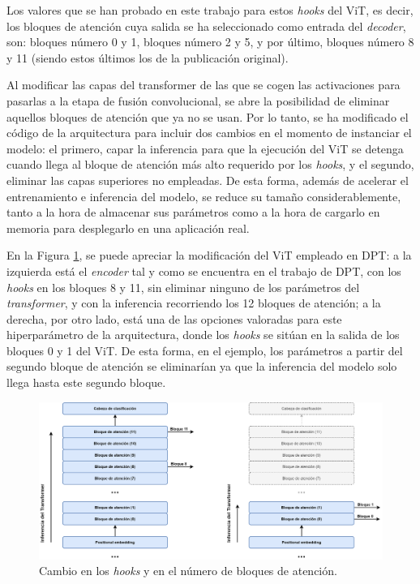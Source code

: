 Los valores que se han probado en este trabajo para estos \textit{hooks} del ViT, es decir, los bloques de atención cuya salida se ha seleccionado como entrada del \textit{decoder}, son: bloques número 0 y 1, bloques número 2 y 5, y por último, bloques número 8 y 11 (siendo estos últimos los de la publicación original).

Al modificar las capas del transformer de las que se cogen las activaciones para pasarlas a la etapa de fusión convolucional, se abre la posibilidad de eliminar aquellos bloques de atención que ya no se usan. Por lo tanto, se ha modificado el código de la arquitectura para incluir dos cambios en el momento de instanciar el modelo: el primero, capar la inferencia para que la ejecución del ViT se detenga cuando llega al bloque de atención más alto requerido por los \textit{hooks}, y el segundo, eliminar las capas superiores no empleadas. De esta forma, además de acelerar el entrenamiento e inferencia del modelo, se reduce su tamaño considerablemente, tanto a la hora de almacenar sus parámetros como a la hora de cargarlo en memoria para desplegarlo en una aplicación real. 

En la Figura \ref{fig:attention_block_num}, se puede apreciar la modificación del ViT empleado en DPT: a la izquierda está el \textit{encoder} tal y como se encuentra en el trabajo de DPT, con los \textit{hooks} en los bloques 8 y 11, sin eliminar ninguno de los parámetros del \textit{transformer}, y con la inferencia recorriendo los 12 bloques de atención; a la derecha, por otro lado, está una de las opciones valoradas para este hiperparámetro de la arquitectura, donde los \textit{hooks} se sitúan en la salida de los bloques 0 y 1 del ViT. De esta forma, en el ejemplo, los parámetros a partir del segundo bloque de atención se eliminarían ya que la inferencia del modelo solo llega hasta este segundo bloque.

\begin{figure}[H]
\centering
\includegraphics[width=\textwidth]{imagenes/DPT-cambio-bloques-transformer.png}
\caption{Cambio en los \textit{hooks} y en el número de bloques de atención.}
\label{fig:attention_block_num}
\end{figure}



